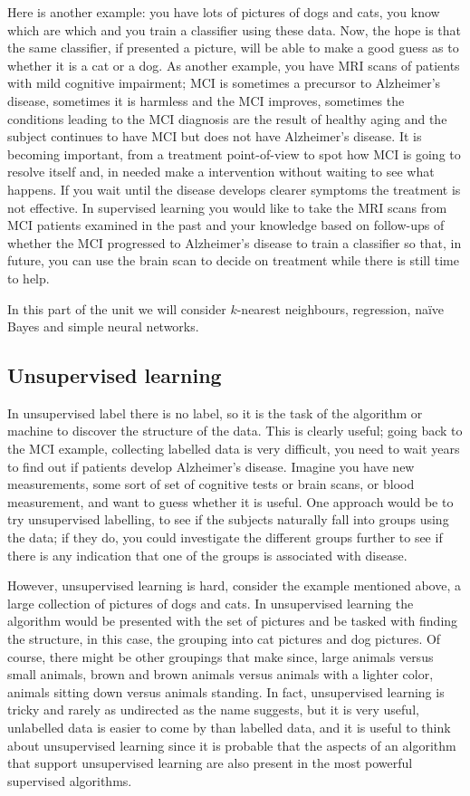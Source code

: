 \documentclass[12pt]{article}
\begin{document}
Here is another example: you have lots of pictures of dogs and cats,
you know which are which and you train a classifier using these
data. Now, the hope is that the same classifier, if presented a
picture, will be able to make a good guess as to whether it is a cat
or a dog. As another example, you have MRI scans of patients with mild
cognitive impairment; MCI is sometimes a precursor to Alzheimer's
disease, sometimes it is harmless and the MCI improves, sometimes the
conditions leading to the MCI diagnosis are the result of healthy
aging and the subject continues to have MCI but does not have
Alzheimer's disease. It is becoming important, from a treatment
point-of-view to spot how MCI is going to resolve itself and, in
needed make a intervention without waiting to see what happens. If you
wait until the disease develops clearer symptoms the treatment is not
effective. In supervised learning you would like to take the MRI scans
from MCI patients examined in the past and your knowledge based on
follow-ups of whether the MCI progressed to Alzheimer's disease to
train a classifier so that, in future, you can use the brain scan to
decide on treatment while there is still time to help.

In this part of the unit we will consider $k$-nearest neighbours,
regression, na\"ive Bayes and simple neural networks.

\subsection{Unsupervised learning}

In unsupervised label there is no label, so it is the task of the
algorithm or machine to discover the structure of the data. This is
clearly useful; going back to the MCI example, collecting labelled
data is very difficult, you need to wait years to find out if patients
develop Alzheimer's disease. Imagine you have new measurements, some
sort of set of cognitive tests or brain scans, or blood measurement,
and want to guess whether it is useful. One approach would be to try
unsupervised labelling, to see if the subjects naturally fall into
groups using the data; if they do, you could investigate the different
groups further to see if there is any indication that one of the
groups is associated with disease.

However, unsupervised learning is hard, consider the example mentioned
above, a large collection of pictures of dogs and cats. In
unsupervised learning the algorithm would be presented with the set of
pictures and be tasked with finding the structure, in this case, the
grouping into cat pictures and dog pictures. Of course, there might be
other groupings that make since, large animals versus small animals,
brown and brown animals versus animals with a lighter color, animals
sitting down versus animals standing. In fact, unsupervised learning
is tricky and rarely as undirected as the name suggests, but it is
very useful, unlabelled data is easier to come by than labelled data,
and it is useful to think about unsupervised learning since it is
probable that the aspects of an algorithm that support unsupervised
learning are also present in the most powerful supervised algorithms.
\end{document}
